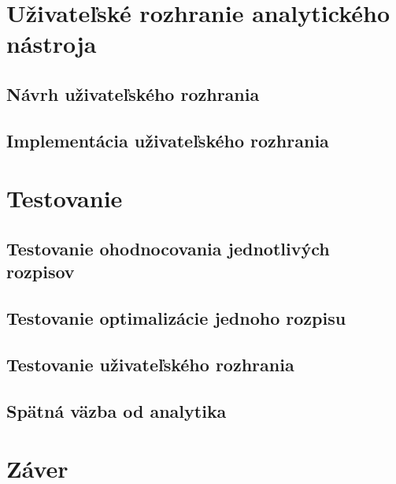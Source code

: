 \chapter{Uživateľské rozhranie analytického nástroja} %
\label{uzivatelske_rozhranie}
\section{Návrh uživateľského rozhrania}
\section{Implementácia uživateľského rozhrania}

\chapter{Testovanie} %
\label{testovanie}
\section{Testovanie ohodnocovania jednotlivých rozpisov}
\section{Testovanie optimalizácie jednoho rozpisu}
\section{Testovanie uživateľského rozhrania}
\section{Spätná väzba od analytika}

\chapter{Záver} %
\label{zaver}

































